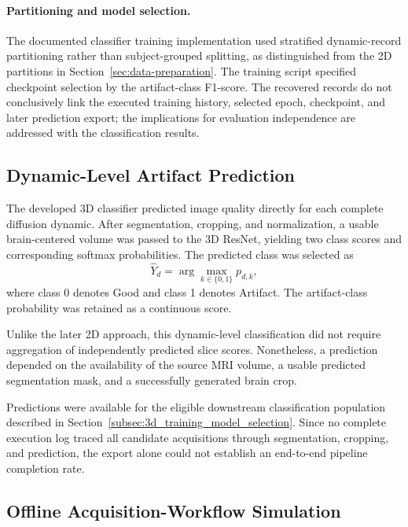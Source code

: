\paragraph{Partitioning and model selection.}
The documented classifier training implementation used stratified dynamic-record partitioning rather than subject-grouped splitting, as distinguished from the 2D partitions in Section~\ref{sec:data-preparation}. The training script specified checkpoint selection by the artifact-class F1-score. The recovered records do not conclusively link the executed training history, selected epoch, checkpoint, and later prediction export; the implications for evaluation independence are addressed with the classification results.

\subsection{Dynamic-Level Artifact Prediction}
\label{subsec:3d_dynamic_prediction}

The developed 3D classifier predicted image quality directly for each complete diffusion dynamic. After segmentation, cropping, and normalization, a usable brain-centered volume was passed to the 3D ResNet, yielding two class scores and corresponding softmax probabilities. The predicted class was selected as
\begin{equation}
\hat{Y}_d=\arg\max_{k\in\{0,1\}}p_{d,k},
\end{equation}
where class 0 denotes Good and class 1 denotes Artifact. The artifact-class probability was retained as a continuous score.

Unlike the later 2D approach, this dynamic-level classification did not require aggregation of independently predicted slice scores. Nonetheless, a prediction depended on the availability of the source MRI volume, a usable predicted segmentation mask, and a successfully generated brain crop.

Predictions were available for the eligible downstream classification population described in Section~\ref{subsec:3d_training_model_selection}. Since no complete execution log traced all candidate acquisitions through segmentation, cropping, and prediction, the export alone could not establish an end-to-end pipeline completion rate.

\subsection{Offline Acquisition-Workflow Simulation}
\label{subsec:3d_offline_workflow}

